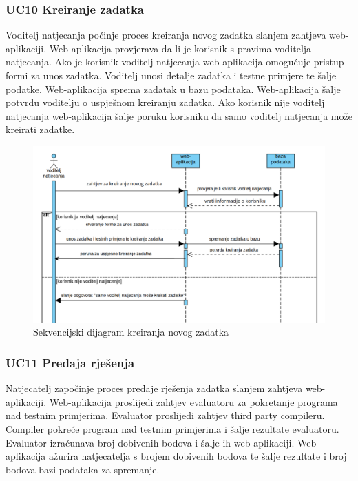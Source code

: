 				\clearpage 

				\subsubsection*{UC10 Kreiranje zadatka}
				
				Voditelj natjecanja počinje proces kreiranja novog zadatka slanjem zahtjeva web-aplikaciji. Web-aplikacija provjerava da li je korisnik s pravima voditelja natjecanja. Ako je korisnik voditelj natjecanja web-aplikacija omogućuje pristup formi za unos zadatka. Voditelj unosi detalje zadatka i testne primjere te šalje podatke. Web-aplikacija sprema zadatak u bazu podataka. Web-aplikacija šalje potvrdu voditelju o uspješnom kreiranju zadatka. Ako korisnik nije voditelj natjecanja web-aplikacija šalje poruku korisniku da samo voditelj natjecanja može kreirati zadatke.
				\vspace{20mm}

				\begin{figure}[htbp]
					\centering
					\includegraphics[width=\linewidth]{slike/kreiranje_zadatka.png}
					\caption{Sekvencijski dijagram kreiranja novog zadatka}\label{fig:seqdiag_zadatka}
				\end{figure}
				
				
				\clearpage 
				
				\subsubsection*{UC11 Predaja rješenja}
				
				Natjecatelj započinje proces predaje rješenja zadatka slanjem zahtjeva web-aplikaciji. Web-aplikacija proslijedi zahtjev evaluatoru za pokretanje programa nad testnim primjerima. Evaluator proslijedi zahtjev third party compileru. Compiler pokreće program nad testnim primjerima i šalje rezultate evaluatoru. Evaluator izračunava broj dobivenih bodova i šalje ih web-aplikaciji. Web-aplikacija ažurira natjecatelja s brojem dobivenih bodova te šalje rezultate i broj bodova bazi podataka za spremanje.
				\vspace{20mm}

